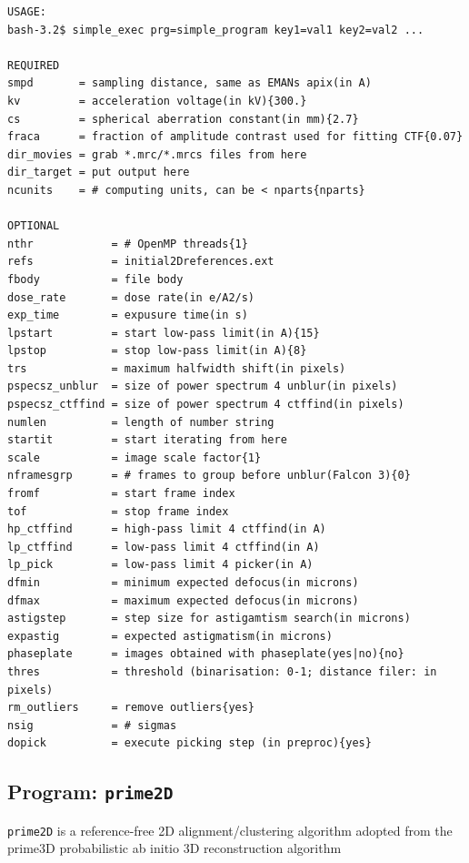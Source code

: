 \documentclass[a4paper,11pt]{article}
\newcommand{\prgname}[1]{\textcolor{NavyBlue}{\texttt{#1}}}
\begin{document}
\begin{verbatim}
USAGE:
bash-3.2$ simple_exec prg=simple_program key1=val1 key2=val2 ...

REQUIRED
smpd       = sampling distance, same as EMANs apix(in A)
kv         = acceleration voltage(in kV){300.}
cs         = spherical aberration constant(in mm){2.7}
fraca      = fraction of amplitude contrast used for fitting CTF{0.07}
dir_movies = grab *.mrc/*.mrcs files from here
dir_target = put output here
ncunits    = # computing units, can be < nparts{nparts}

OPTIONAL
nthr            = # OpenMP threads{1}
refs            = initial2Dreferences.ext
fbody           = file body
dose_rate       = dose rate(in e/A2/s)
exp_time        = expusure time(in s)
lpstart         = start low-pass limit(in A){15}
lpstop          = stop low-pass limit(in A){8}
trs             = maximum halfwidth shift(in pixels)
pspecsz_unblur  = size of power spectrum 4 unblur(in pixels)
pspecsz_ctffind = size of power spectrum 4 ctffind(in pixels)
numlen          = length of number string
startit         = start iterating from here
scale           = image scale factor{1}
nframesgrp      = # frames to group before unblur(Falcon 3){0}
fromf           = start frame index
tof             = stop frame index
hp_ctffind      = high-pass limit 4 ctffind(in A)
lp_ctffind      = low-pass limit 4 ctffind(in A)
lp_pick         = low-pass limit 4 picker(in A)
dfmin           = minimum expected defocus(in microns)
dfmax           = maximum expected defocus(in microns)
astigstep       = step size for astigamtism search(in microns)
expastig        = expected astigmatism(in microns)
phaseplate      = images obtained with phaseplate(yes|no){no}
thres           = threshold (binarisation: 0-1; distance filer: in pixels)
rm_outliers     = remove outliers{yes}
nsig            = # sigmas
dopick          = execute picking step (in preproc){yes}
\end{verbatim}

\subsection{Program: \prgname{prime2D}}
\label{prime2D}
\prgname{prime2D} is a reference-free 2D alignment/clustering algorithm adopted from the prime3D probabilistic ab initio 3D reconstruction algorithm
\end{document}
